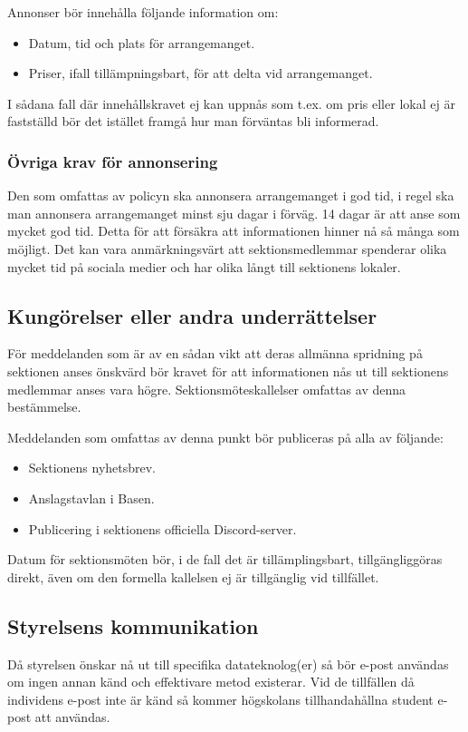 \documentclass[a4paper]{dtek}
\begin{document}
Annonser bör innehålla följande information om:
\begin{itemize}
    \item Datum, tid och plats för arrangemanget.
    \item Priser, ifall tillämpningsbart, för att delta vid arrangemanget.
\end{itemize}
I sådana fall där innehållskravet ej kan uppnås som t.ex. om pris eller lokal ej är fastställd
bör det istället framgå hur man förväntas bli informerad.

\subsubsection{Övriga krav för annonsering}
Den som omfattas av policyn ska annonsera arrangemanget i god tid, i regel ska man
annonsera arrangemanget minst sju dagar i förväg. 14 dagar är att anse som mycket god
tid. Detta för att försäkra att informationen hinner nå så många som möjligt. Det kan vara
anmärkningsvärt att sektionsmedlemmar spenderar olika mycket tid på sociala medier och
har olika långt till sektionens lokaler.

\subsection{Kungörelser eller andra underrättelser}
För meddelanden som är av en sådan vikt att deras allmänna spridning på sektionen anses
önskvärd bör kravet för att informationen nås ut till sektionens medlemmar anses vara
högre. Sektionsmöteskallelser omfattas av denna bestämmelse.

Meddelanden som omfattas av denna punkt bör publiceras på alla av följande:
\begin{itemize}
    \item Sektionens nyhetsbrev.
    \item Anslagstavlan i Basen.
    \item Publicering i sektionens officiella Discord-server.
\end{itemize}
Datum för sektionsmöten bör, i de fall det är tillämplingsbart, tillgängliggöras direkt, även
om den formella kallelsen ej är tillgänglig vid tillfället.

\subsection{Styrelsens kommunikation}
Då styrelsen önskar nå ut till specifika datateknolog(er) så bör e-post användas om ingen
annan känd och effektivare metod existerar. Vid de tillfällen då individens e-post inte är
känd så kommer högskolans tillhandahållna student e-post att användas.
\end{document}
